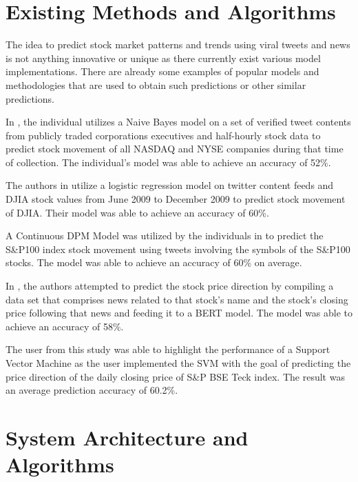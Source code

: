 \documentclass[conference]{IEEEtran}
\begin{document}
\section{Existing Methods and Algorithms}
The idea to predict stock market patterns and trends using viral tweets and news is not anything innovative or unique as there currently exist various model implementations. There are already some examples of popular models and methodologies that are used to obtain such predictions or other similar predictions.

In \cite{b10}, the individual utilizes a Naive Bayes model on a set of verified tweet contents from publicly traded corporations executives and half-hourly stock data to predict stock movement of all NASDAQ and NYSE companies during that time of collection. The individual’s model was able to achieve an accuracy of 52\%.

The authors in \cite{b1} utilize a logistic regression model on twitter content feeds and DJIA stock values from June 2009 to December 2009 to predict stock movement of DJIA. Their model was able to achieve an accuracy of 60\%.

A Continuous DPM Model was utilized by the individuals in \cite{b9} to predict the S\&P100 index stock movement using tweets involving the symbols of the S\&P100 stocks. The model was able to achieve an accuracy of 60\% on average.

In \cite{b15}, the authors attempted to predict the stock price direction by compiling a data set that comprises news related to that stock’s name and the stock’s closing price following that news and feeding it to a BERT model. The model was able to achieve an accuracy of 58\%.

The user from this study \cite{b14} was able to highlight the performance of a Support Vector Machine as the user implemented the SVM with the goal of predicting the price direction of the daily closing price of S\&P BSE Teck index. The result was an average prediction accuracy of 60.2\%. 

\section{System Architecture and Algorithms}
\end{document}
